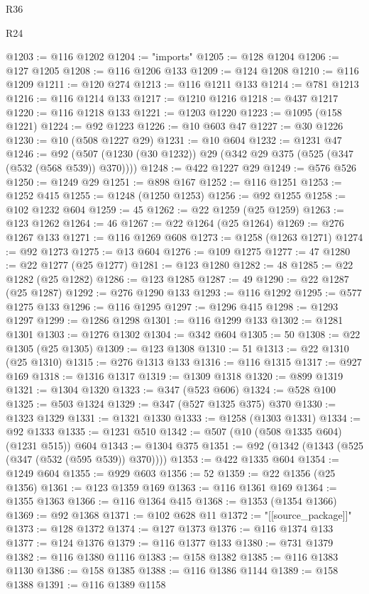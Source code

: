 \begin{lexlean}{R36}
\begin{lexlean}{R24}
\begin{coremodule}
{{{{{{{{{{{{{{{{{{{{{{{{{{{{{{{{{{{{{{{{{{{{{{{{{{{{{{{{{{{{{{{{{{{{{{{{{{{{{{{{{{{{{{{{{{{{{{{{{{{{{{{{{{{{{{{{{{{{{{{{{{{{{{{{{{{{{{{{{{{{{{{{{{{{{{{{{{{{{{{{{{{{{{{{{{{{{{{{{{{{{{{{{{{{{{{{{{{@1203 := @116 @1202
@1204 := "imports"
@1205 := @128 @1204
@1206 := @127 @1205
@1208 := @116 @1206 @133
@1209 := @124 @1208
@1210 := @116 @1209
@1211 := @120 @274
@1213 := @116 @1211 @133
@1214 := @781 @1213
@1216 := @116 @1214 @133
@1217 := @1210 @1216
@1218 := @437 @1217
@1220 := @116 @1218 @133
@1221 := @1203 @1220
@1223 := @1095 (@158 @1221)
@1224 := @92 @1223
@1226 := @10 @603 @47
@1227 := @30 @1226
@1230 := @10 (@508 @1227 @29)
@1231 := @10 @604
@1232 := @1231 @47
@1246 := @92 (@507 (@1230 (@30 @1232)) @29 (@342 @29 @375 (@525 (@347 (@532 (@568 @539)) @370))))
@1248 := @422 @1227 @29
@1249 := @576 @526
@1250 := @1249 @29
@1251 := @898 @167
@1252 := @116 @1251
@1253 := @1252 @415
@1255 := @1248 (@1250 @1253)
@1256 := @92 @1255
@1258 := @102 @1232 @604
@1259 := 45
@1262 := @22 @1259 (@25 @1259)
@1263 := @123 @1262
@1264 := 46
@1267 := @22 @1264 (@25 @1264)
@1269 := @276 @1267 @133
@1271 := @116 @1269 @608
@1273 := @1258 (@1263 @1271)
@1274 := @92 @1273
@1275 := @13 @604
@1276 := @109 @1275
@1277 := 47
@1280 := @22 @1277 (@25 @1277)
@1281 := @123 @1280
@1282 := 48
@1285 := @22 @1282 (@25 @1282)
@1286 := @123 @1285
@1287 := 49
@1290 := @22 @1287 (@25 @1287)
@1292 := @276 @1290 @133
@1293 := @116 @1292
@1295 := @577 @1275 @133
@1296 := @116 @1295
@1297 := @1296 @415
@1298 := @1293 @1297
@1299 := @1286 @1298
@1301 := @116 @1299 @133
@1302 := @1281 @1301
@1303 := @1276 @1302
@1304 := @342 @604
@1305 := 50
@1308 := @22 @1305 (@25 @1305)
@1309 := @123 @1308
@1310 := 51
@1313 := @22 @1310 (@25 @1310)
@1315 := @276 @1313 @133
@1316 := @116 @1315
@1317 := @927 @169
@1318 := @1316 @1317
@1319 := @1309 @1318
@1320 := @899 @1319
@1321 := @1304 @1320
@1323 := @347 (@523 @606)
@1324 := @528 @100
@1325 := @503 @1324
@1329 := @347 (@527 @1325 @375) @370
@1330 := @1323 @1329
@1331 := @1321 @1330
@1333 := @1258 (@1303 @1331)
@1334 := @92 @1333
@1335 := @1231 @510
@1342 := @507 (@10 (@508 @1335 @604) (@1231 @515)) @604
@1343 := @1304 @375
@1351 := @92 (@1342 (@1343 (@525 (@347 (@532 (@595 @539)) @370))))
@1353 := @422 @1335 @604
@1354 := @1249 @604
@1355 := @929 @603
@1356 := 52
@1359 := @22 @1356 (@25 @1356)
@1361 := @123 @1359 @169
@1363 := @116 @1361 @169
@1364 := @1355 @1363
@1366 := @116 @1364 @415
@1368 := @1353 (@1354 @1366)
@1369 := @92 @1368
@1371 := @102 @628 @11
@1372 := "[[source_package]]"
@1373 := @128 @1372
@1374 := @127 @1373
@1376 := @116 @1374 @133
@1377 := @124 @1376
@1379 := @116 @1377 @133
@1380 := @731 @1379
@1382 := @116 @1380 @1116
@1383 := @158 @1382
@1385 := @116 @1383 @1130
@1386 := @158 @1385
@1388 := @116 @1386 @1144
@1389 := @158 @1388
@1391 := @116 @1389 @1158
}}}}}}}}}}}}}}}}}}}}}}}}}}}}}}}}}}}}}}}}}}}}}}}}}}}}}}}}}}}}}}}}}}}}}}}}}}}}}}}}}}}}}}}}}}}}}}}}}}}}}}}}}}}}}}}}}}}}}}}}}}}}}}}}}}}}}}}}}}}}}}}}}}}}}}}}}}}}}}}}}}}}}}}}}}}}}}}}}}}}}}}}}}}}}}}}}}}
\end{coremodule}
\end{lexlean}
\end{lexlean}
